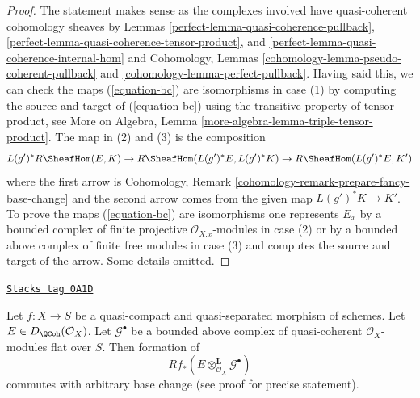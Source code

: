 \begin{proof}

The statement makes sense as the complexes involved have quasi-coherent
cohomology sheaves by Lemmas
\ref{perfect-lemma-quasi-coherence-pullback},
\ref{perfect-lemma-quasi-coherence-tensor-product}, and
\ref{perfect-lemma-quasi-coherence-internal-hom} and
Cohomology, Lemmas \ref{cohomology-lemma-pseudo-coherent-pullback} and
\ref{cohomology-lemma-perfect-pullback}.
Having said this, we can check the maps (\ref{equation-bc})
are isomorphisms in case (1) by computing the source and target
of (\ref{equation-bc}) using the transitive property of tensor product, see
More on Algebra, Lemma \ref{more-algebra-lemma-triple-tensor-product}.
The map in (2) and (3) is the composition
$$
L(g')^*R\SheafHom(E, K) \to R\SheafHom(L(g')^*E, L(g')^*K)
\to R\SheafHom(L(g')^*E, K')
$$
where the first arrow is
Cohomology, Remark \ref{cohomology-remark-prepare-fancy-base-change}
and the second arrow comes from the given map $L(g')^*K \to K'$.
To prove the maps (\ref{equation-bc}) are isomorphisms one represents
$E_x$ by a bounded complex of finite projective $\mathcal{O}_{X. x}$-modules
in case (2) or by a bounded above complex of finite free modules in case (3)
and computes the source and target of the arrow.
Some details omitted.
\end{proof}

\begin{lemma}
\label{perfect-lemma-base-change-tensor}
\href{https://stacks.math.columbia.edu/tag/0A1D}{\texttt{Stacks tag 0A1D}}

Let $f : X \to S$ be a quasi-compact and quasi-separated morphism of
schemes. Let $E \in D_\QCoh(\mathcal{O}_X)$. Let $\mathcal{G}^\bullet$
be a bounded above complex of quasi-coherent
$\mathcal{O}_X$-modules flat over $S$. Then formation of
$$
Rf_*(E \otimes^\mathbf{L}_{\mathcal{O}_X} \mathcal{G}^\bullet)
$$
commutes with arbitrary base change (see proof for precise statement).
\end{lemma}

